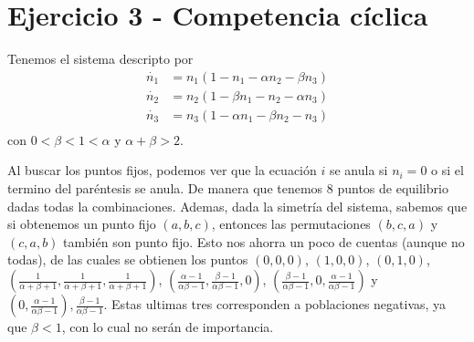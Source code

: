 \section*{Ejercicio 3 - Competencia cíclica}

Tenemos el sistema descripto por
\begin{align}
    \dot{n_1} &= n_1 \left( 1 - n_1 -\alpha n_2 - \beta n_3 \right) \\[6pt]
    \dot{n_2} &= n_2 \left( 1 - \beta n_1 - n_2 - \alpha n_3 \right) \\[6pt]
    \dot{n_3} &= n_3 \left( 1 - \alpha n_1 -\beta n_2 - n_3 \right) \\[6pt]
\end{align}
con $0<\beta<1 < \alpha$ y $\alpha + \beta > 2$.

Al buscar los puntos fijos, podemos ver que la ecuación $i$ se anula si $n_i = 0$ o si el termino del paréntesis se anula. De manera que tenemos 8 puntos de equilibrio dadas todas la combinaciones. Ademas, dada la simetría del sistema, sabemos que si obtenemos un punto fijo $\left(a,b,c\right)$, entonces las permutaciones $\left(b,c,a\right)$ y $\left(c,a,b\right)$
también son punto fijo. Esto nos ahorra un poco de cuentas (aunque no todas), de las cuales se obtienen los puntos $\left(0,0,0\right)$, $\left(1,0,0\right)$, $\left(0,1,0\right)$, $\left(\frac{1}{\alpha + \beta + 1},\frac{1}{\alpha + \beta + 1},\frac{1}{\alpha + \beta + 1}\right)$, $\left(\frac{\alpha-1}{\alpha \beta -1},\frac{\beta -1 }{\alpha \beta -1},0\right)$, $\left(\frac{\beta -1 }{\alpha \beta -1},0, \frac{\alpha-1}{\alpha \beta -1}\right)$ y $\left(0, \frac{\alpha-1}{\alpha \beta -1}\right), \frac{\beta -1 }{\alpha \beta -1}$. Estas ultimas tres corresponden a poblaciones negativas, ya que $\beta < 1$, con lo cual no serán de importancia.


